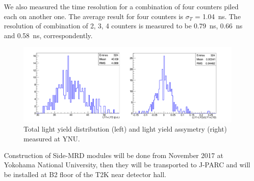 We also measured the time resolution for a combination of four  counters piled each on another one.
The average result for four counters is  $\sigma_T$ = 1.04~ns. %
The resolution of combination of 2, 3, 4 counters is measured to be 0.79~ns, 0.66~ns and 0.58~ns, correspondently.
\begin{figure}[tbh]
\begin{center}
\includegraphics[width=0.8\linewidth]{fig/side_mrd_ly.pdf}
\end{center}
\caption{
Total light yield distribution (left) and light yield assymetry (right) measured at YNU.
}
\label{fig:side_mrd_ly}
\end{figure}

Construction of Side-MRD modules will be done from November 2017 at Yokohama National University, then they will be transported to J-PARC and will be installed at  B2 floor of the T2K near detector hall.%
